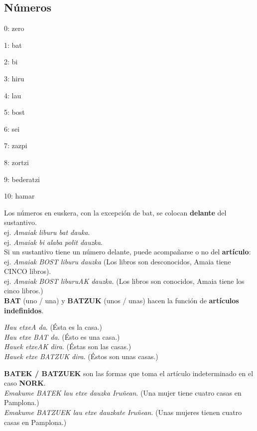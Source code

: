 \documentclass[11pt, a4paper]{article}
\begin{document}
\subsection{N\'umeros}
\begin{itemize}
\begin{multicols}{2}
\item 0: zero
\item 1: bat
\item 2: bi
\item 3: hiru
\item 4: lau
\item 5: bost
\item 6: sei
\item 7: zazpi
\item 8: zortzi
\item 9: bederatzi
\item 10: hamar
\end{multicols}
\end{itemize}

\noindent Los números en euskera, con la excepción de bat, se colocan \textbf{delante} del sustantivo.\\
\indent ej. \textit{Amaiak liburu bat dauka}.\\
\indent ej. \textit{Amaiak bi alaba polit dauzka}.\\

\noindent Si un sustantivo tiene un número delante, puede acompañarse o no del \textbf{artículo}:\\
\indent ej. \textit{Amaiak BOST liburu dauzka} (Los libros son desconocidos, Amaia tiene CINCO libros).\\
\indent ej. \textit{Amaiak BOST liburuAK dauzka.} (Los libros son conocidos, Amaia tiene los cinco libros.)\\

\noindent \textbf{BAT} (uno / una) y \textbf{BATZUK} (unos / unas) hacen la función de \textbf{artículos indefinidos}.

\begin{multicols}{2}
\noindent \textit{Hau etxeA da}. (Ésta es la casa.)\\
\textit{Hau etxe BAT da}. (Ésto es una casa.)\\
\textit{Hauek etxeAK dira}. (Éstas son las casas.)\\
\textit{Hauek etxe BATZUK dira}. (Éstos son unas casas.)
\end{multicols}

\noindent \textbf{BATEK / BATZUEK} son las formas que toma el artículo indeterminado en el caso \textbf{NORK}.\\
\indent \textit{Emakume BATEK lau etxe dauzka Iruñean}.
(Una mujer tiene cuatro casas en Pamplona.)\\
\indent \textit{Emakume BATZUEK lau etxe dauzkate Iruñean}.
(Unas mujeres tienen cuatro casas en Pamplona.)
\end{document}
